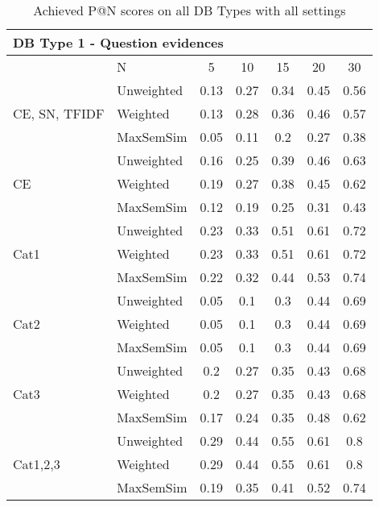 \documentclass[conference]{IEEEtran}
\begin{document}
\begin{table*}[!h]
	\centering
	\renewcommand{\arraystretch}{1.3}
	\caption{Achieved P@N scores on all DB Types with all settings}
	\label{tab:resultsmrr1}
	\begin{tabular}{l||l|ccccc}\hline
	
		\multicolumn{7}{l}{DB Type 1 - Question evidences}\\\hline\hline
		& N & 5 & 10 & 15 & 20 & 30\\\hline
		
		\multirow{3}{*}{CE, SN, TFIDF} & Unweighted & 0.13 & 0.27 & 0.34 & 0.45 & 0.56\\
		 & Weighted & 0.13 & 0.28 & 0.36 & 0.46 & 0.57\\
		 & MaxSemSim & 0.05 & 0.11 & 0.2 & 0.27 & 0.38\\
		 
		\multirow{3}{*}{CE} & Unweighted & 0.16 & 0.25 & 0.39 & 0.46 & 0.63\\
		 & Weighted & 0.19 & 0.27 & 0.38 & 0.45 & 0.62\\
		 & MaxSemSim & 0.12 & 0.19 & 0.25 & 0.31 & 0.43\\ 
		\hline
		
		\multirow{3}{*}{Cat1} & Unweighted & 0.23 & 0.33 & 0.51 & 0.61 & 0.72\\
		 & Weighted & 0.23 & 0.33 & 0.51 & 0.61 & 0.72\\
		 & MaxSemSim & 0.22 & 0.32 & 0.44 & 0.53 & 0.74\\ 
		\hline
		
		\multirow{3}{*}{Cat2} & Unweighted & 0.05 & 0.1 & 0.3 & 0.44 & 0.69\\
		 & Weighted & 0.05 & 0.1 & 0.3 & 0.44 & 0.69\\
		 & MaxSemSim & 0.05 & 0.1 & 0.3 & 0.44 & 0.69\\ 
		\hline
		
		\multirow{3}{*}{Cat3} & Unweighted & 0.2 & 0.27 & 0.35 & 0.43 & 0.68\\
		 & Weighted & 0.2 & 0.27 & 0.35 & 0.43 & 0.68\\
		 & MaxSemSim & 0.17 & 0.24 & 0.35 & 0.48 & 0.62\\ 
		\hline
		
		\multirow{3}{*}{Cat1,2,3} & Unweighted & 0.29 & 0.44 & 0.55 & 0.61 & 0.8\\
		 & Weighted & 0.29 & 0.44 & 0.55 & 0.61 & 0.8\\
		 & MaxSemSim & 0.19 & 0.35 & 0.41 & 0.52 & 0.74\\ 
		\hline
		

\end{tabular}
\end{table*}
\end{document}
